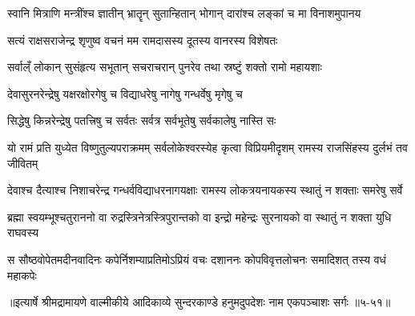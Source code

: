 \twolineshloka
{स्वानि मित्राणि मन्त्रींश्च ज्ञातीन् भ्रातॄन् सुतान्हितान्}
{भोगान् दारांश्च लङ्कां च मा विनाशमुपानय} %

\twolineshloka
{सत्यं राक्षसराजेन्द्र शृणुष्व वचनं मम}
{रामदासस्य दूतस्य वानरस्य विशेषतः} %

\twolineshloka
{सर्वाल्ँ लोकान् सुसंहृत्य सभूतान् सचराचरान्}
{पुनरेव तथा स्रष्टुं शक्तो रामो महायशाः} %

\twolineshloka
{देवासुरनरेन्द्रेषु यक्षरक्षोरगेषु च}
{विद्याधरेषु नागेषु गन्धर्वेषु मृगेषु च} %

\twolineshloka
{सिद्धेषु किन्नरेन्द्रेषु पतत्त्रिषु च सर्वतः}
{सर्वत्र सर्वभूतेषु सर्वकालेषु नास्ति सः} %

\threelineshloka
{यो रामं प्रति युध्येत विष्णुतुल्यपराक्रमम्}
{सर्वलोकेश्वरस्येह कृत्वा विप्रियमीदृशम्}
{रामस्य राजसिंहस्य दुर्लभं तव जीवितम्} %

\twolineshloka
{देवाश्च दैत्याश्च निशाचरेन्द्र गन्धर्वविद्याधरनागयक्षाः}
{रामस्य लोकत्रयनायकस्य स्थातुं न शक्ताः समरेषु सर्वे} %

\twolineshloka
{ब्रह्मा स्वयम्भूश्चतुराननो वा रुद्रस्त्रिनेत्रस्त्रिपुरान्तको वा}
{इन्द्रो महेन्द्रः सुरनायको वा स्थातुं न शक्ता युधि राघवस्य} %

\twolineshloka
{स सौष्ठवोपेतमदीनवादिनः कपेर्निशम्याप्रतिमोऽप्रियं वचः}
{दशाननः कोपविवृत्तलोचनः समादिशत् तस्य वधं महाकपेः} %


॥इत्यार्षे श्रीमद्रामायणे वाल्मीकीये आदिकाव्ये सुन्दरकाण्डे हनुमदुपदेशः नाम एकपञ्चाशः सर्गः ॥५-५१॥
